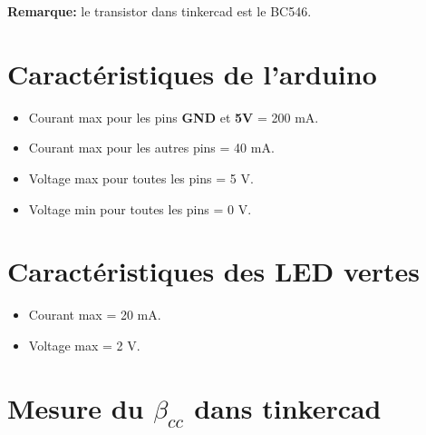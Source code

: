 \documentclass[a4paper]{article}
\begin{document}
\textbf{Remarque:} le transistor dans tinkercad est le BC546.















\section{Caractéristiques de l'arduino}





\begin{itemize}
    \item Courant max pour les pins \textbf{GND} et \textbf{5V} = 200 mA.
    \item Courant max pour les autres pins = 40 mA.
    \item Voltage max pour toutes les pins = 5 V.
    \item Voltage min pour toutes les pins = 0 V.
\end{itemize}















\section{Caractéristiques des LED vertes}





\begin{itemize}
    \item Courant max = 20 mA.
    \item Voltage max = 2 V.
\end{itemize}















\section{Mesure du $ \beta_{cc} $ dans tinkercad}
\end{document}
